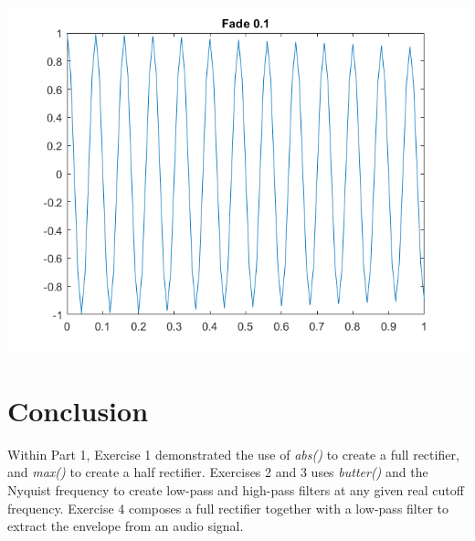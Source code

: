 \documentclass[11pt]{article}
\begin{document}
\includegraphics[width=\textwidth]{example_delete_me.png}

\section{Conclusion}

Within Part 1, Exercise 1 demonstrated the use of \textit{abs()} to create a full rectifier, and \textit{max()} to create a half rectifier.
Exercises 2 and 3 uses \textit{butter()} and the Nyquist frequency to create low-pass and high-pass filters at any given real cutoff frequency.
Exercise 4 composes a full rectifier together with a low-pass filter to extract the envelope from an audio signal.
\end{document}
